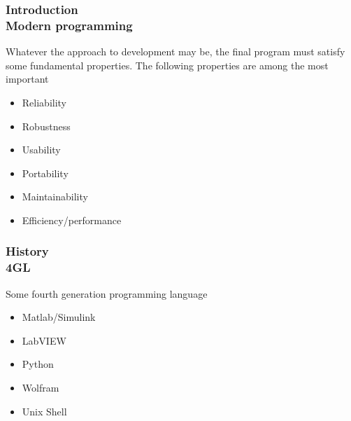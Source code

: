 \documentclass[hyperref={pdfpagelabels=true}]{beamer}
\begin{document}
\begin{frame}
\frametitle{Introduction \\ {\large Modern programming}}
Whatever the approach to development may be, the final program must satisfy some fundamental properties. The following properties are among the most important
\begin{itemize}
\item[\ding{90}] Reliability
\item[\ding{90}] Robustness
\item[\ding{90}] Usability
\item[\ding{90}] Portability
\item[\ding{90}] Maintainability
\item[\ding{90}] Efficiency/performance
\end{itemize}
\end{frame}

\begin{frame}
\frametitle{History \\ {\large 4GL}}
Some fourth generation programming language
\begin{itemize}
\item Matlab/Simulink
\item LabVIEW
\item Python
\item Wolfram
\item Unix Shell
\end{itemize}
\end{frame}
\end{document}
